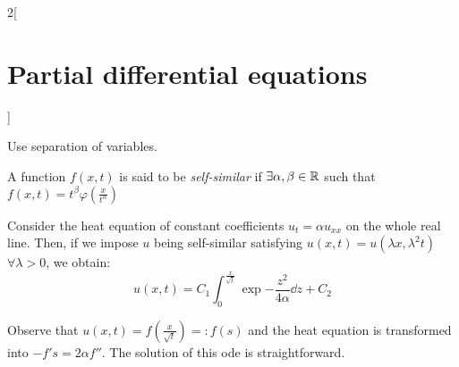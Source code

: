 \documentclass[../../../main_math.tex]{subfiles}
\begin{document}
\begin{multicols}{2}[\section{Partial differential equations}]
  \begin{sproof}
    Use separation of variables.
  \end{sproof}
  \begin{definition}
    A function $f(x,t)$ is said to be \emph{self-similar} if $\exists \alpha,\beta\in\mathbb{R}$ such that $f(x,t)=t^\beta\varphi\left(\frac{x}{t^\alpha}\right)$
  \end{definition}
  \begin{proposition}
    Consider the heat equation of constant coefficients $ u_{t} =\alpha u_{xx}$ on the whole real line. Then, if we impose $u$ being self-similar satisfying $u(x,t)=u(\lambda x,\lambda^2t)$ $\forall\lambda>0$, we obtain:
    \begin{equation}\label{PDE:selfsimilarsol}
      u(x,t)=C_1\int_0^{\frac{x}{\sqrt{t}}}\exp{-\frac{z^2}{4\alpha}}\dd{z} +C_2
    \end{equation}
  \end{proposition}
  \begin{sproof}
    Observe that $u(x,t) = f(\frac{x}{\sqrt{t}})=:f(s)$ and the heat equation is transformed into $-f's=2\alpha f''$. The solution of this ode is straightforward.
  \end{sproof}

\end{multicols}
\end{document}
